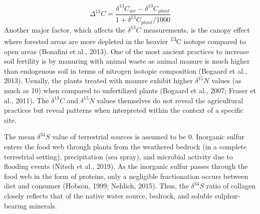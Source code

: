 \documentclass[5p]{elsarticle} %
\begin{document}
\[\Delta^{13}C = \frac{\delta ^{13}C_{air} - \delta ^{13}C_{plant}}{1+\delta ^{13}C_{plant}/1000}\]
Another major factor, which affects the \(\delta ^{13}C\) measurements, is the canopy effect where forested areas are more depleted in the heavier \textsuperscript{13}C isotope compared to open areas (Bonafini et al., 2013). One of the most ancient practices to increase soil fertility is by manuring with animal waste as animal manure is much higher than endogenous soil in terms of nitrogen isotopic composition (Bogaard et al., 2013). Usually, the plants treated with manure exhibit higher \(\delta ^{15}N\) values (as much as 10\permil) when compared to unfertilized plants (Bogaard et al., 2007; Fraser et al., 2011). The \(\delta ^{13}C\) and \(\delta ^{15}N\) values themselves do not reveal the agricultural practices but reveal patterns when interpreted within the context of a specific site.

The mean \(\delta ^{34}S\) value of terrestrial sources is assumed to be 0\permil. Inorganic sulfur enters the food web through plants from the weathered bedrock (in a complete terrestrial setting), precipitation (sea spray), and microbial activity due to flooding events (Nitsch et al., 2019). As the inorganic sulfur passes through the food web in the form of proteins, only a negligible fractionation occurs between diet and consumer (Hobson, 1999; Nehlich, 2015). Thus, the \(\delta ^{34}S\) ratio of collagen closely reflects that of the native water source, bedrock, and soluble sulphur-bearing minerals.
\end{document}
